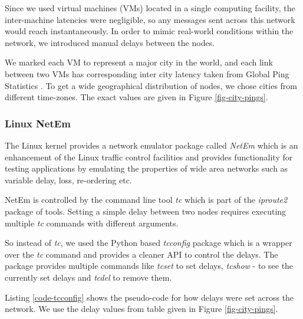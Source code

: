 Since we used virtual machines (VMs) located in a single computing facility, the inter-machine latencies were negligible, so any messages sent across this network would reach instantaneously. In order to mimic real-world conditions within the network, we introduced manual delays between the nodes.

We marked each VM to represent a major city in the world, and each link between two VMs has corresponding inter city latency taken from Global Ping Statistics \cite{GlobalDelayStats}.  To get a wide geographical distribution of nodes, we chose cities from different time-zones. The exact values are given in Figure \ref{fig-city-pings}.

\subsubsection{Linux NetEm}

The Linux kernel provides a network emulator package called \textit{NetEm} \cite{netem} which is an enhancement of the Linux traffic control facilities and provides functionality for testing applications by emulating the properties of wide area networks such as variable delay, loss, re-ordering etc. \cite{netemTutorial} 

NetEm is controlled by the command line tool \textit{tc} which is part of the \textit{iproute2} package of tools. 
Setting a simple delay between two nodes requires executing multiple \textit{tc} commands with different arguments.

So instead of \textit{tc}, we used the Python based \textit{tcconfig} package \cite{tcconfig} which is a wrapper over the \textit{tc} command and provides a cleaner API to control the delays. The package provides multiple commands like \textit{tcset} to set delays, \textit{tcshow} - to see the currently set delays and \textit{tcdel} to remove them. 

Listing \ref{code-tcconfig} shows the pseudo-code for how delays were set across the network. 
We use the delay values from table given in Figure \ref{fig-city-pings}.

